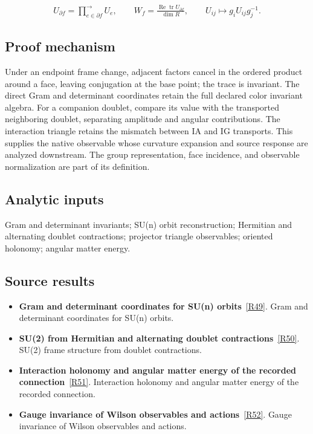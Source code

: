 \documentclass[11pt,a4paper]{article}
\begin{document}
\begin{gather*}
U_{\partial f}=\prod_{e\in\partial f}^{\longrightarrow}U_e,\qquad
W_f=\frac{\operatorname{Re}\operatorname{tr}U_{\partial f}}{\dim R},\qquad
U_{ij}\mapsto g_iU_{ij}g_j^{-1}.
\end{gather*}
\subsection*{Proof mechanism}
Under an endpoint frame change, adjacent factors cancel in the ordered product around a face, leaving conjugation at the base point; the trace is invariant. The direct Gram and determinant coordinates retain the full declared color invariant algebra. For a companion doublet, compare its value with the transported neighboring doublet, separating amplitude and angular contributions. The interaction triangle retains the mismatch between IA and IG transports. This supplies the native observable whose curvature expansion and source response are analyzed downstream. The group representation, face incidence, and observable normalization are part of its definition.
\subsection*{Analytic inputs}
Gram and determinant invariants; SU(n) orbit reconstruction; Hermitian and alternating doublet contractions; projector triangle observables; oriented holonomy; angular matter energy.
\subsection*{Source results}
\begin{itemize}
\item \textbf{Gram and determinant coordinates for SU(n) orbits}~\hyperref[src:thm-sm-direct-orbit-isomorphism]{[R49]}. Gram and determinant coordinates for SU(n) orbits.
\item \textbf{SU(2) from Hermitian and alternating doublet contractions}~\hyperref[src:thm-sm-direct-su2-invariants]{[R50]}. SU(2) frame structure from doublet contractions.
\item \textbf{Interaction holonomy and angular matter energy of the recorded connection}~\hyperref[src:prop-ym-recorded-interaction-sector]{[R51]}. Interaction holonomy and angular matter energy of the recorded connection.
\item \textbf{Gauge invariance of Wilson observables and actions}~\hyperref[src:thm-wilson-action-gauge-invariance]{[R52]}. Gauge invariance of Wilson observables and actions.
\end{itemize}
\end{document}
